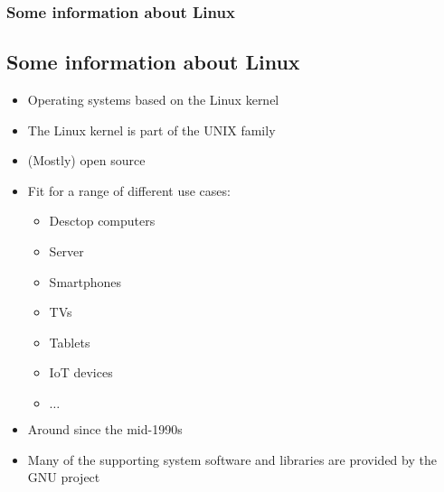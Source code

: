 \begin{frame}
	\frametitle{Some information about Linux}
	\subsection{Some information about Linux}
	
	\begin{itemize}
		\item Operating systems based on the Linux kernel\cite{linux}
		\item The Linux kernel is part of the UNIX family
		\item (Mostly) open source
		\item Fit for a range of different use cases:
			\begin{tiny}
				\begin{itemize}
					\item Desctop computers
					\item Server
					\item Smartphones
					\item TVs
					\item Tablets
					\item IoT devices
					\item $\dots$
				\end{itemize}
			\end{tiny}
		\item Around since the mid-1990s
		\item Many of the supporting system software and libraries are provided by the GNU project\cite{gnu}
	\end{itemize}
\end{frame}
